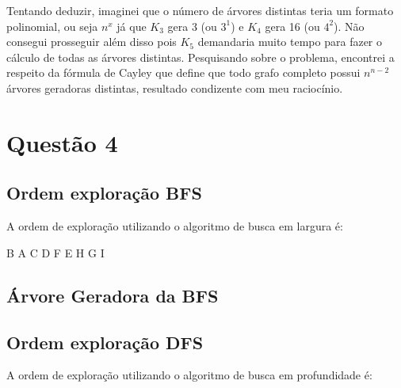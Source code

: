 \documentclass{article}
\begin{document}
Tentando deduzir, imaginei que o número de árvores distintas teria um formato polinomial, ou seja ${n^x}$ já que ${K_3}$ gera 3 (ou ${3^1}$) e ${K_4}$ gera 16 (ou ${4^2}$). Não consegui prosseguir além disso pois ${K_5}$ demandaria muito tempo para fazer o cálculo de todas as árvores distintas. Pesquisando sobre o problema, encontrei a respeito da fórmula de Cayley que define que todo grafo completo possui ${n^{n - 2}}$ árvores geradoras distintas, resultado condizente com meu raciocínio.

\newpage 
\section{Questão 4}

\subsection{Ordem exploração BFS}

A ordem de exploração utilizando o algoritmo de busca em largura é: 

B A C D F E H G I

\subsection{Árvore Geradora da BFS}


\subsection{Ordem exploração DFS}

A ordem de exploração utilizando o algoritmo de busca em profundidade é: 
\end{document}
